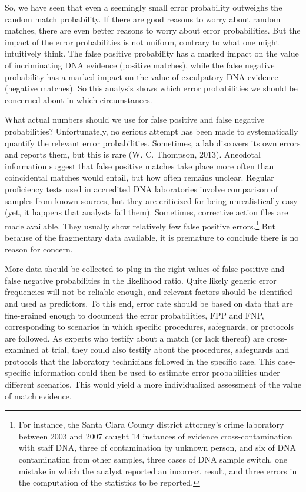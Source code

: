 \documentclass[
  10pt,
  dvipsnames,enabledeprecatedfontcommands]{scrartcl}
\begin{document}
So, we have seen that even a seemingly small error probability outweighs
the random match probability. If there are good reasons to worry about
random matches, there are even better reasons to worry about error
probabilities. But the impact of the error probabilities is not uniform,
contrary to what one might intuitively think. The false positive
probability has a marked impact on the value of incriminating DNA
evidence (positive matches), while the false negative probability has a
marked impact on the value of exculpatory DNA evidence (negative
matches). So this analysis shows which error probabilities we should be
concerned about in which circumstances.

What actual numbers should we use for false positive and false negative
probabilities? Unfortunately, no serious attempt has been made to
systematically quantify the relevant error probabilities. Sometimes, a
lab discovers its own errors and reports them, but this is rare (W. C.
Thompson, 2013). Anecdotal information suggest that false positive
matches take place more often than coincidental matches would entail,
but how often remains unclear. Regular proficiency tests used in
accredited DNA laboratories involve comparison of samples from known
sources, but they are criticized for being unrealistically easy (yet, it
happens that analysts fail them). Sometimes, corrective action files are
made available. They usually show relatively few false positive
errors.\footnote{For instance, the Santa Clara County district
  attorney's crime laboratory between 2003 and 2007 caught 14 instances
  of evidence cross-contamination with staff DNA, three of contamination
  by unknown person, and six of DNA contamination from other samples,
  three cases of DNA sample switch, one mistake in which the analyst
  reported an incorrect result, and three errors in the computation of
  the statistics to be reported.} But because of the fragmentary data
available, it is premature to conclude there is no reason for concern.

More data should be collected to plug in the right values of false
positive and false negative probabilities in the likelihood ratio. Quite
likely generic error frequencies will not be reliable enough, and
relevant factors should be identified and used as predictors. To this
end, error rate should be based on data that are fine-grained enough to
document the error probabilities, FPP and FNP, corresponding to
scenarios in which specific procedures, safeguards, or protocols are
followed. As experts who testify about a match (or lack thereof) are
cross-examined at trial, they could also testify about the procedures,
safeguards and protocols that the laboratory technicians followed in the
specific case. This case-specific information could then be used to
estimate error probabilities under different scenarios. This would yield
a more individualized assessment of the value of match evidence.
\end{document}
